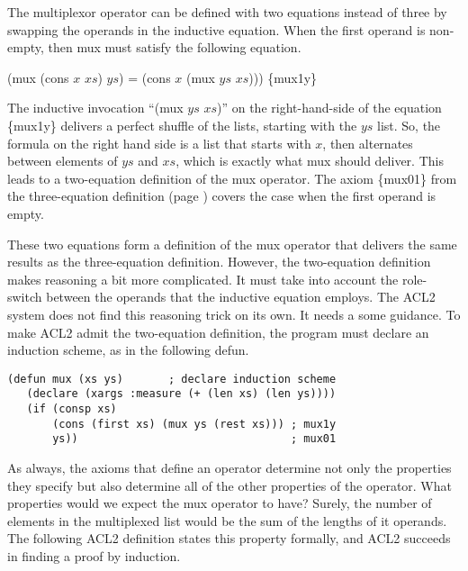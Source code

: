 \begin{aside}
The multiplexor operator can be defined with two equations instead of three
by swapping the operands in the inductive equation.
When the first operand is non-empty, then mux must satisfy the following equation.

\hspace{1cm} (mux (cons $x$ $xs$) $ys$) = (cons $x$ (mux $ys$ $xs$)))
\hfill \{mux1y\}

The inductive invocation ``(mux $ys$ $xs$)''
on the right-hand-side of the equation \{mux1y\}
delivers a perfect shuffle
of the lists, starting with the $ys$ list.
So, the formula on the right hand side is a list that starts with $x$,
then alternates between elements of $ys$ and $xs$, which is exactly what
mux should deliver. This leads to a two-equation definition of the mux operator.
The axiom \{mux01\} from the three-equation definition
(page \pageref{def:mux})
covers the case when the first operand is empty.

These two equations form a definition of the mux operator
that delivers the same results as the three-equation definition.
However, the two-equation definition makes reasoning a bit more complicated.
It must take into account the role-switch between the operands
that the inductive equation employs.
The ACL2 system does not find this reasoning trick on its own.
It needs a some guidance.
To make ACL2 admit the two-equation definition,
the program must declare an induction scheme,
as in the following defun.
\\

\label{mux-2eq-defun}
\begin{Verbatim}
(defun mux (xs ys)       ; declare induction scheme
   (declare (xargs :measure (+ (len xs) (len ys))))
   (if (consp xs)
       (cons (first xs) (mux ys (rest xs))) ; mux1y
       ys))                                 ; mux01
\end{Verbatim}

\caption{Defining mux with Two Equations}
\label{aside:mux-2eq}
\end{aside}

As always, the axioms that define an operator
determine not only the properties they specify
but also determine all of the other properties of the operator.
What properties would we expect the mux operator to have?
Surely, the number of elements in the multiplexed list
would be the sum of the lengths of it operands.
The following ACL2 definition states this property formally,
and ACL2 succeeds in finding a proof by induction.

